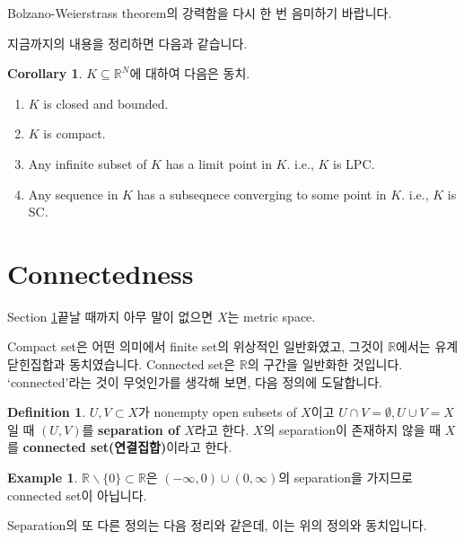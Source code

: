 \documentclass[12pt]{article}
\theoremstyle{definition}
\newtheorem{cor}[thm]{Corollary}
\newtheorem{defn}[thm]{Definition}
\newtheorem*{ex}{Example}
\def\RR{\mathbb{R}}
\begin{document}
Bolzano-Weierstrass theorem의 강력함을 다시 한 번 음미하기 바랍니다.

지금까지의 내용을 정리하면 다음과 같습니다.

	\begin{cor}
		\(K \subseteq \RR^N\)에 대하여 다음은 동치.
		\begin{enumerate}[label=(\alph*), leftmargin=2\parindent]
			\item
			\(K\) is closed and bounded.
			\item
			\(K\) is compact.
			\item
			Any infinite subset of \(K\) has a limit point in \(K\). i.e., \(K\) is LPC.
			\item
			Any sequence in \(K\) has a subseqnece converging to some point in \(K\). i.e., \(K\) is SC.
		\end{enumerate}	
	\end{cor}

\newpage

\section{Connectedness} \label{sec conn}

Section \ref{sec conn}\이 끝날 때까지 아무 말이 없으면 \(X\)는 metric space.

Compact set은 어떤 의미에서 finite set의 위상적인 일반화였고, 그것이 \(\RR\)에서는 유계닫힌집합과 동치였습니다. Connected set은 \(\RR\)의 구간을 일반화한 것입니다. `connected'라는 것이 무엇인가를 생각해 보면, 다음 정의에 도달합니다.

	\begin{defn}
		\(U, V \subset X\)가 nonempty open subsets of \(X\)이고 \(U \cap V = \emptyset, U \cup V = X\)일 때 \((U, V)\)를 \textbf{separation of \(X\)}라고 한다. \(X\)의 separation이 존재하지 않을 때 \(X\)를 \textbf{connected set(연결집합)}이라고 한다.
	\end{defn}

	\begin{ex}
		\(\RR \backslash \{0\} \subset \RR\)은 \((-\infty, 0)\cup(0, \infty)\)의 separation을 가지므로 connected set이 아닙니다.
	\end{ex}

Separation의 또 다른 정의는 다음 정리와 같은데, 이는 위의 정의와 동치입니다.
\end{document}
